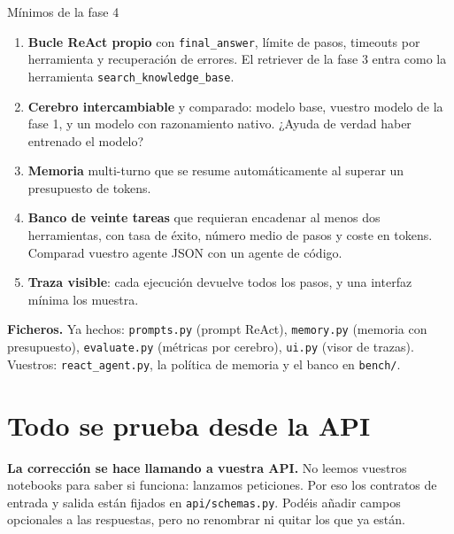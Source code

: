 \documentclass[11pt,a4paper]{article}
\newcommand{\code}[1]{{\small\texttt{#1}}}
\newcommand{\file}[1]{{\small\texttt{\textcolor{arcablue}{#1}}}}
\begin{document}
\begin{minimos}{Mínimos de la fase 4}
\begin{enumerate}
  \item \textbf{Bucle ReAct propio} con \code{final\_answer}, límite de pasos, timeouts por
  herramienta y recuperación de errores. El retriever de la fase 3 entra como la herramienta
  \code{search\_knowledge\_base}.
  \item \textbf{Cerebro intercambiable} y comparado: modelo base, vuestro modelo de la
  fase 1, y un modelo con razonamiento nativo. ¿Ayuda de verdad haber entrenado el modelo?
  \item \textbf{Memoria} multi-turno que se resume automáticamente al superar un presupuesto
  de tokens.
  \item \textbf{Banco de veinte tareas} que requieran encadenar al menos dos herramientas,
  con tasa de éxito, número medio de pasos y coste en tokens. Comparad vuestro agente JSON
  con un agente de código.
  \item \textbf{Traza visible}: cada ejecución devuelve todos los pasos, y una interfaz
  mínima los muestra.
\end{enumerate}
\end{minimos}

\textbf{Ficheros.} Ya hechos: \file{prompts.py} (prompt ReAct), \file{memory.py} (memoria con
presupuesto), \file{evaluate.py} (métricas por cerebro), \file{ui.py} (visor de trazas).
Vuestros: \file{react\_agent.py}, la política de memoria y el banco en \file{bench/}.

\section{Todo se prueba desde la API}

\textbf{La corrección se hace llamando a vuestra API.} No leemos vuestros notebooks para saber
si funciona: lanzamos peticiones. Por eso los contratos de entrada y salida están fijados en
\file{api/schemas.py}. Podéis añadir campos opcionales a las respuestas, pero no renombrar ni
quitar los que ya están.
\end{document}
